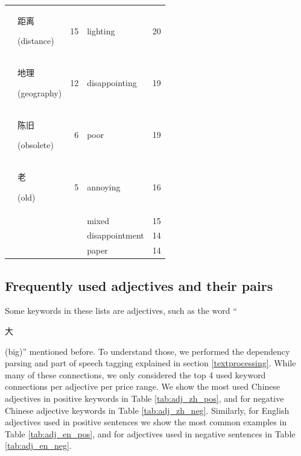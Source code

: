 \documentclass[smallextended,natbib]{svjour3}       %
\begin{document}
\begin{table}[ht]
{\begin{tabular}{|c|lr|lr|}
                                                             & \begin{CJK}{UTF8}{gbsn}距离\end{CJK} (distance)  & 15   & lighting       & 20  \\  
                                                             & \begin{CJK}{UTF8}{gbsn}地理\end{CJK} (geography) & 12   & disappointing  & 19  \\  
                                                             & \begin{CJK}{UTF8}{gbsn}陈旧\end{CJK} (obsolete)  & 6    & poor           & 19  \\  
                                                             & \begin{CJK}{UTF8}{gbsn}老\end{CJK} (old)        & 5    & annoying       & 16  \\  
                                                             &                                                &      & mixed          & 15  \\  
                                                             &                                                &      & disappointment & 14  \\  
                                                             &                                                &      & paper          & 14  \\ \hline
        \end{tabular}%
        }
    \end{table}

  \subsection{Frequently used adjectives and their pairs}\label{adjresults}

    Some keywords in these lists are adjectives, such as the word ``\begin{CJK}{UTF8}{gbsn}大\end{CJK} (big)'' mentioned before. To understand those, we performed the dependency parsing and part of speech tagging explained in section \ref{textprocessing}. While many of these connections, we only considered the top 4 used keyword connections per adjective per price range. We show the most used Chinese adjectives in positive keywords in Table \ref{tab:adj_zh_pos}, and for negative Chinese adjective keywords in Table \ref{tab:adj_zh_neg}. Similarly, for English adjectives used in positive sentences we show the most common examples in Table \ref{tab:adj_en_pos}, and for adjectives used in negative sentences in Table \ref{tab:adj_en_neg}.
\end{document}
